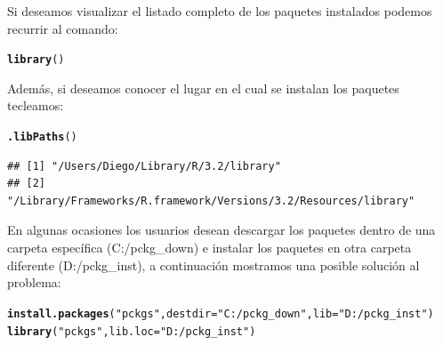 \documentclass[11pt,a4paper,oneside]{book}\usepackage[]{graphicx}\usepackage[]{color}
\makeatletter
\newcommand{\hlstr}[1]{\textcolor[rgb]{0.192,0.494,0.8}{#1}}%
\newcommand{\hlstd}[1]{\textcolor[rgb]{0.345,0.345,0.345}{#1}}%
\newcommand{\hlkwc}[1]{\textcolor[rgb]{0.333,0.667,0.333}{#1}}%
\newcommand{\hlkwd}[1]{\textcolor[rgb]{0.737,0.353,0.396}{\textbf{#1}}}%
\newenvironment{kframe}{%
 \def\at@end@of@kframe{}%
 \ifinner\ifhmode%
  \def\at@end@of@kframe{\end{minipage}}%
  \begin{minipage}{\columnwidth}%
 \fi\fi%
 \def\FrameCommand##1{\hskip\@totalleftmargin \hskip-\fboxsep
 \colorbox{shadecolor}{##1}\hskip-\fboxsep
     \hskip-\linewidth \hskip-\@totalleftmargin \hskip\columnwidth}%
 \MakeFramed {\advance\hsize-\width
   \@totalleftmargin\z@ \linewidth\hsize
   \@setminipage}}%
 {\par\unskip\endMakeFramed%
 \at@end@of@kframe}
\newenvironment{knitrout}{}{} %
\makeatother
\begin{document}
\begin{itemize}
Si deseamos visualizar el listado completo de los paquetes instalados podemos recurrir al comando:
\begin{knitrout}
\color{fgcolor}\begin{kframe}
\begin{alltt}
\hlkwd{library}\hlstd{()}
\end{alltt}
\end{kframe}
\end{knitrout}
Además, si deseamos conocer el lugar en el cual se instalan los paquetes tecleamos:
\begin{knitrout}
\color{fgcolor}\begin{kframe}
\begin{alltt}
\hlkwd{.libPaths}\hlstd{()}
\end{alltt}
\begin{verbatim}
## [1] "/Users/Diego/Library/R/3.2/library"                            
## [2] "/Library/Frameworks/R.framework/Versions/3.2/Resources/library"
\end{verbatim}
\end{kframe}
\end{knitrout}

En algunas ocasiones los usuarios desean descargar los paquetes dentro de una carpeta específica (C:/pckg\_down) e instalar los paquetes en otra carpeta diferente (D:/pckg\_inst), a continuación mostramos una posible solución al problema:
\begin{knitrout}
\color{fgcolor}\begin{kframe}
\begin{alltt}
\hlkwd{install.packages}\hlstd{(}\hlstr{"pckgs"}\hlstd{,} \hlkwc{destdir}\hlstd{=}\hlstr{"C:/pckg_down"}\hlstd{,} \hlkwc{lib}\hlstd{=}\hlstr{"D:/pckg_inst"}\hlstd{)}
\hlkwd{library}\hlstd{(}\hlstr{"pckgs"}\hlstd{,} \hlkwc{lib.loc}\hlstd{=}\hlstr{"D:/pckg_inst"}\hlstd{)}
\end{alltt}
\end{kframe}
\end{knitrout}


\end{itemize}
\end{document}
